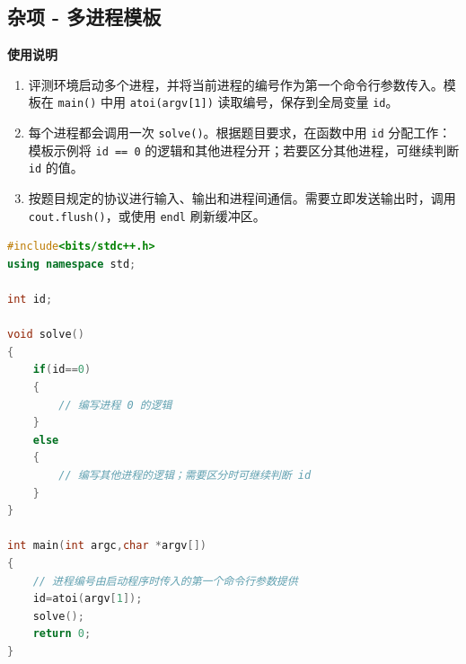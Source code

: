 \documentclass[10pt,landscape,a4paper]{article}
\begin{document}
\begin{multicols*}{3}
\subsection*{杂项 - 多进程模板}
\par\addvspace{0.7ex}\noindent\textbf{使用说明}\par\nobreak
\begin{enumerate}[start=1]
\item 评测环境启动多个进程，并将当前进程的编号作为第一个命令行参数传入。模板在 \texttt{m\allowbreak{}a\allowbreak{}i\allowbreak{}n\allowbreak{}(\allowbreak{})} 中用 \texttt{a\allowbreak{}t\allowbreak{}o\allowbreak{}i\allowbreak{}(\allowbreak{}a\allowbreak{}r\allowbreak{}g\allowbreak{}v\allowbreak{}[\allowbreak{}1\allowbreak{}]\allowbreak{})} 读取编号，保存到全局变量 \texttt{i\allowbreak{}d}。
\item 每个进程都会调用一次 \texttt{s\allowbreak{}o\allowbreak{}l\allowbreak{}v\allowbreak{}e\allowbreak{}(\allowbreak{})}。根据题目要求，在函数中用 \texttt{i\allowbreak{}d} 分配工作：模板示例将 \texttt{i\allowbreak{}d\allowbreak{} \allowbreak{}=\allowbreak{}=\allowbreak{} \allowbreak{}0} 的逻辑和其他进程分开；若要区分其他进程，可继续判断 \texttt{i\allowbreak{}d} 的值。
\item 按题目规定的协议进行输入、输出和进程间通信。需要立即发送输出时，调用 \texttt{c\allowbreak{}o\allowbreak{}u\allowbreak{}t\allowbreak{}.\allowbreak{}f\allowbreak{}l\allowbreak{}u\allowbreak{}s\allowbreak{}h\allowbreak{}(\allowbreak{})}，或使用 \texttt{e\allowbreak{}n\allowbreak{}d\allowbreak{}l} 刷新缓冲区。
\end{enumerate}
\par{}\par
\begin{lstlisting}[language=C++]
#include<bits/stdc++.h>
using namespace std;

int id;

void solve()
{
    if(id==0)
    {
        // 编写进程 0 的逻辑
    }
    else
    {
        // 编写其他进程的逻辑；需要区分时可继续判断 id
    }
}

int main(int argc,char *argv[])
{
    // 进程编号由启动程序时传入的第一个命令行参数提供
    id=atoi(argv[1]);
    solve();
    return 0;
}
\end{lstlisting}

\end{multicols*}
\end{document}

